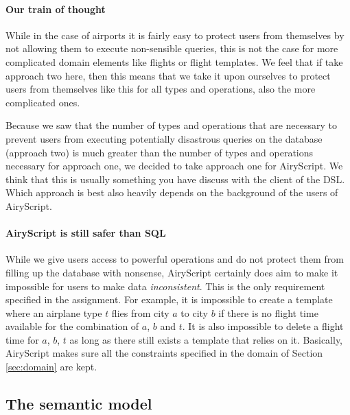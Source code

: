\paragraph{Our train of thought}
While in the case of airports it is fairly easy to protect users from themselves
by not allowing them to execute non-sensible queries, this is not the case for
more complicated domain elements like flights or flight templates. We feel that
if take approach two here, then this means that we take it upon ourselves to
protect users from themselves like this for all types and operations, also the
more complicated ones.

Because we saw that the number of types and operations that are necessary to
prevent users from executing potentially disastrous queries on the database
(approach two) is much greater than the number of types and operations necessary
for approach one, we decided to take approach one for AiryScript. We think that
this is usually something you have discuss with the client of the DSL. Which
approach is best also heavily depends on the background of the users of
AiryScript.

\paragraph{AiryScript is still safer than SQL}
While we give users access to powerful operations and do not protect them from
filling up the database with nonsense, AiryScript certainly does aim to make it
impossible for users to make data \emph{inconsistent}. This is the only
requirement specified in the assignment. For example, it is impossible to create
a template where an airplane type $t$ flies from city $a$ to city $b$ if there
is no flight time available for the combination of $a$, $b$ and $t$. It is also
impossible to delete a flight time for $a$, $b$, $t$ as long as there still
exists a template that relies on it. Basically, AiryScript makes sure all the
constraints specified in the domain of Section \ref{sec:domain} are kept.




\subsection{The semantic model}



